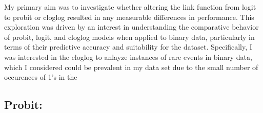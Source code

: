 \documentclass[
  letterpaper,
  DIV=11,
  numbers=noendperiod]{scrartcl}
\begin{document}
My primary aim was to investigate whether altering the link function
from logit to probit or cloglog resulted in any measurable differences
in performance. This exploration was driven by an interest in
understanding the comparative behavior of probit, logit, and cloglog
models when applied to binary data, particularly in terms of their
predictive accuracy and suitability for the dataset. Specifically, I was
interested in the cloglog to anlayze instances of rare events in binary
data, which I considered could be prevalent in my data set due to the
small number of occurences of 1's in the

\subsection{Probit:}\label{probit}
\end{document}
